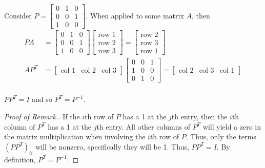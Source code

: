 \begin{example}
    Consider $P = 
    \begin{bmatrix}
    0 & 1 & 0 \\ 
    0 & 0 & 1 \\ 
    1 & 0 & 0
    \end{bmatrix}$. When applied to some matrix $A$, then
    \begin{align*}
        PA &= \begin{bmatrix}
            0 & 1 & 0 \\ 
            0 & 0 & 1 \\ 
            1 & 0 & 0
            \end{bmatrix}
            \begin{bmatrix}
            \text{row 1} \\
            \text{row 2} \\
            \text{row 3}
            \end{bmatrix}
            = \begin{bmatrix}
            \text{row 2} \\
            \text{row 3} \\
            \text{row 1}
            \end{bmatrix} \\
        AP^T &=
            \begin{bmatrix}
            \text{col 1} &
            \text{col 2} &
            \text{col 3}
            \end{bmatrix}
            \begin{bmatrix}
            0 & 0 & 1 \\ 
            1 & 0 & 0 \\ 
            0 & 1 & 0
            \end{bmatrix}
            = \begin{bmatrix}
            \text{col 2} &
            \text{col 3} &
            \text{col 1}
            \end{bmatrix} \\
    \end{align*}
\end{example}
\begin{remark*}
$PP^T = I$ and so $P^T = P^{-1}$.
\end{remark*}

\begin{proof}[Proof of Remark.]
If the $i$th row of $P$ has a 1 at the $j$th entry, then the $i$th column of $P^T$ has a 1 at the $j$th entry. All other columns of $P^T$ will yield a zero in the matrix multiplication when involving the $i$th row of $P$. Thus, only the terms $(PP^T)_{ii}$ will be nonzero, specifically they will be 1. Thus, $PP^T = I$. By definition, $P^T = P^{-1}$.
\end{proof}

